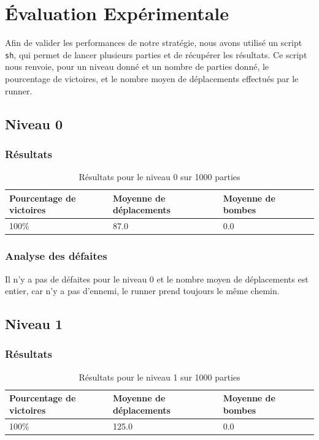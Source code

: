 \chapter{Évaluation Expérimentale}
\label{cp:evaluation}

Afin de valider les performances de notre stratégie, nous avons utilisé un script \texttt{sh}, qui permet de lancer plusieurs parties et de récupérer les résultats.
Ce script nous renvoie, pour un niveau donné et un nombre de parties donné, le pourcentage de victoires, et le nombre moyen de déplacements effectués par le runner.

\section{Niveau 0}

\subsection{Résultats}

\begin{table}[!htpb]
    \begin{tabularx}{\textwidth}{lXXX}
        \toprule
        Pourcentage de victoires & Moyenne de déplacements & Moyenne de bombes \\
        \midrule
        100\% & 87.0 & 0.0 \\
        \bottomrule
    \end{tabularx}
    \caption{Résultats pour le niveau 0 sur 1000 parties}
    \label{tab:res-niveau-0}
\end{table}

\subsection{Analyse des défaites}

Il n'y a pas de défaites pour le niveau 0 et le nombre moyen de déplacements est entier, car n'y a pas d'ennemi, le runner prend toujours le même chemin.

\section{Niveau 1}

\subsection{Résultats}

\begin{table}[!htpb]
    \begin{tabularx}{\textwidth}{lXXX}
        \toprule
        Pourcentage de victoires & Moyenne de déplacements & Moyenne de bombes \\
        \midrule
        100\% & 125.0 & 0.0 \\
        \bottomrule
    \end{tabularx}
    \caption{Résultats pour le niveau 1 sur 1000 parties}
    \label{tab:res-niveau-1}
\end{table}

